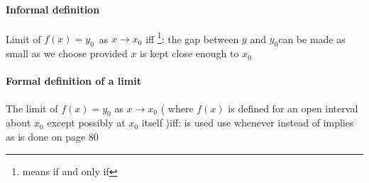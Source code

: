 \documentclass[12pt, a4paper,oneside]{book}
\begin{document}
\paragraph{Informal definition} \begin{paragraph} Limit of $f(x)=y_0 $ as ${x \to x_0}$ iff \footnote{means if and only if}: the gap between $y$ and $y_0$can be made as small as we choose provided $x$ is kept close enough to $x_0$\end{paragraph}
\paragraph{Formal definition of a limit} \begin{paragraph} The limit of $f(x)=y_0$ as ${x \to x_0}$ ( where $f(x)$ is defined for an open interval about $x_0$ except possibly at $x_0$ itself )iff:  is used  use whenever instead of implies as is done on page 80\end{paragraph}
\end{document}
